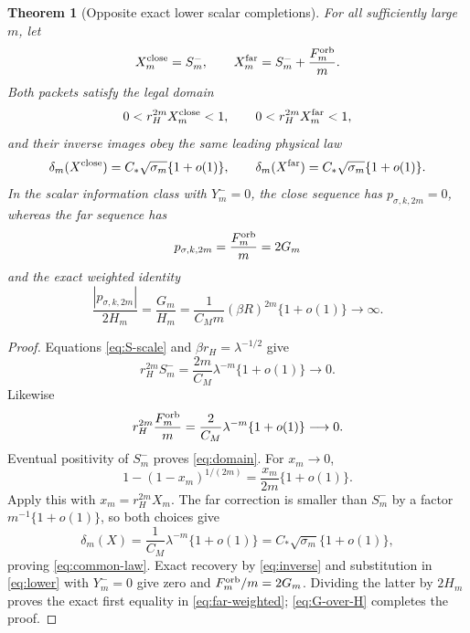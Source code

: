 \documentclass[11pt]{article}
\newtheorem{theorem}{Theorem}[section]
\theoremstyle{remark}
\begin{document}
\begin{theorem}[Opposite exact lower scalar completions]
\label{thm:completions}
For all sufficiently large $m$, let
\begin{equation}\label{eq:two-packets}
 X_m^{\rm close}=S_m^-,
 \qquad
 X_m^{\rm far}=S_m^-+\frac{F_m^{\rm orb}}m.
\end{equation}
Both packets satisfy the legal domain
\begin{equation}\label{eq:domain}
 0<r_H^{2m}X_m^{\rm close}<1,\qquad
 0<r_H^{2m}X_m^{\rm far}<1,
\end{equation}
and their inverse images obey the same leading physical law
\begin{equation}\label{eq:common-law}
 \delta_m(X^{\rm close})
 =C_*\sqrt{\sigma_m}\{1+o(1)\},\qquad
 \delta_m(X^{\rm far})
 =C_*\sqrt{\sigma_m}\{1+o(1)\}.
\end{equation}
In the scalar information class with $Y_m^-=0$, the close sequence has
$p_{\sigma,k,2m}=0$, whereas the far sequence has
\begin{equation}\label{eq:far-residual}
 p_{\sigma,k,2m}=\frac{F_m^{\rm orb}}m=2G_m
\end{equation}
and the exact weighted identity
\begin{equation}\label{eq:far-weighted}
 \frac{|p_{\sigma,k,2m}|}{2H_m}
 =\frac{G_m}{H_m}
 =\frac1{C_Mm}(\beta R)^{2m}\{1+o(1)\}
 \longrightarrow\infty.
\end{equation}
\end{theorem}

\begin{proof}
Equations \eqref{eq:S-scale} and $\beta r_H=\lambda^{-1/2}$ give
\begin{equation}\label{eq:scaled-close}
 r_H^{2m}S_m^-=\frac{2m}{C_M}\lambda^{-m}\{1+o(1)\}
 \longrightarrow0.
\end{equation}
Likewise
\[
 r_H^{2m}\frac{F_m^{\rm orb}}m
 =\frac2{C_M}\lambda^{-m}\{1+o(1)\}\longrightarrow0.
\]
Eventual positivity of $S_m^-$ proves \eqref{eq:domain}.  For $x_m\to0$,
\begin{equation}\label{eq:root-expansion}
 1-(1-x_m)^{1/(2m)}
 =\frac{x_m}{2m}\{1+o(1)\}.
\end{equation}
Apply this with $x_m=r_H^{2m}X_m$.  The far correction is smaller than
$S_m^-$ by a factor $m^{-1}\{1+o(1)\}$, so both choices give
\[
 \delta_m(X)
 =\frac1{C_M}\lambda^{-m}\{1+o(1)\}
 =C_*\sqrt{\sigma_m}\{1+o(1)\},
\]
proving \eqref{eq:common-law}.  Exact recovery by \eqref{eq:inverse} and
substitution in \eqref{eq:lower} with $Y_m^-=0$ give zero and
$F_m^{\rm orb}/m=2G_m$.  Dividing the latter by $2H_m$ proves the exact
first equality in \eqref{eq:far-weighted}; \eqref{eq:G-over-H} completes the
proof.
\end{proof}
\end{document}
